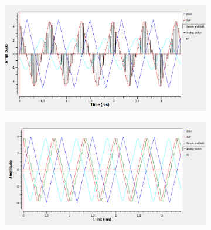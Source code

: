 \begin{figure}[H]
		\begin{subfigure}{.5\textwidth}
	\centering
	\includegraphics[width=\textwidth]{SimulacionesGNURADIO/Condiciones_optimas/TRIANGULAR_TIEMPO_LLAVE_BC.PNG}
	\end{subfigure}
	\begin{subfigure}{.5\textwidth}
	\centering

		\includegraphics[width=\textwidth]{SimulacionesGNURADIO/Condiciones_optimas/TRIANGULAR_TIEMPO_SAMPLE_AND_HOLD_BC.PNG}
	\end{subfigure}
	

\end{figure}
